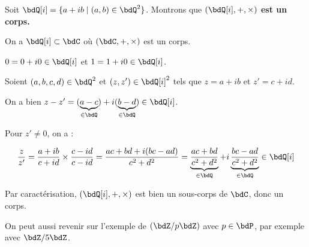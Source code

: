 \documentclass[a4paper,french,bookmarks]{article}
\begin{document}
\begin{example}{}{}
    Soit $\bdQ[i] = \{a + ib \mid (a,b) \in \bdQ^2\}$. Montrons que \bf{$(\bdQ[i], +, \times)$ est un corps}.
    
    \tcblower
    
    \begin{enumerate}
        \ithand On a $\bdQ[i] \subset \bdC$ où $(\bdC, +, \times)$ est un corps.
        
        \ithand $0 = 0+i0 \in \bdQ[i]$ et $1=1+i0 \in \bdQ[i]$.
        
        \ithand Soient $(a, b, c, d) \in \bdQ^2$ et $(z, z') \in \bdQ[i]^2$ tels que $z = a+ib$ et $z' = c+id$.
        
        On a bien $z-z' = (\underbrace{a-c}_{\in \bdQ}) + i(\underbrace{b-d}_{\in \bdQ}) \in \bdQ[i]$.
        
        \ithand Pour $z' \neq 0$, on a :
        
        \[\dfrac{z}{z'} = \dfrac{a+ib}{c+id} \times \dfrac{c-id}{c-id}= \dfrac{ac+bd+i(bc-ad)}{c^2+d^2} = \underbrace{\dfrac{ac+bd}{c^2+d^2}}_{\in \bdQ} + i\underbrace{\dfrac{bc-ad}{c^2+d^2}}_{\in \bdQ} \in \bdQ[i]\]
        
    \end{enumerate}
    
    Par caractérisation, $(\bdQ[i], +, \times)$ est bien un sous-corps de $\bdC$, donc un corps.
\end{example}

On peut aussi revenir sur l'exemple de $(\bdZ/p\bdZ)$ avec $p \in \bdP$, par exemple avec $\bdZ/5\bdZ$.
\end{document}
